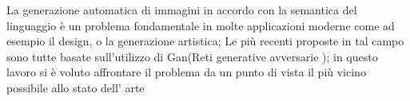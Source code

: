 La generazione automatica di immagini in accordo con la semantica del linguaggio è un problema fondamentale in molte applicazioni moderne come ad esempio il design, o la generazione artistica; 
Le più recenti proposte in tal campo sono tutte basate sull’utilizzo di Gan(Reti generative avversarie ); 
in questo lavoro si è voluto affrontare il problema da un punto di vista il più vicino possibile allo stato dell' arte
